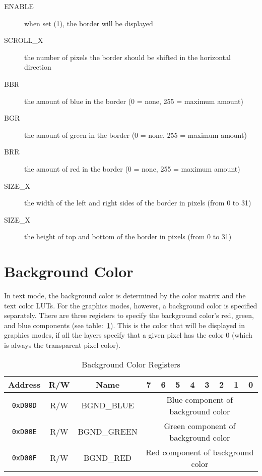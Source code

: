 \begin{description}
    \item[ENABLE] when set (1), the border will be displayed

    \item[SCROLL\_X] the number of pixels the border should be shifted in the horizontal direction

    \item[BBR] the amount of blue in the border (0 = none, 255 = maximum amount)

    \item[BGR] the amount of green in the border (0 = none, 255 = maximum amount)

    \item[BRR] the amount of red in the border (0 = none, 255 = maximum amount)

    \item[SIZE\_X] the width of the left and right sides of the border in pixels (from 0 to 31)

    \item[SIZE\_X] the height of top and bottom of the border in pixels (from 0 to 31)
\end{description}

\section{Background Color}

In text mode, the background color is determined by the color matrix and the text color LUTs. For the graphics modes, however, a background color is specified separately. There are three registers to specify the background color's red, green, and blue components (see table:~\ref{tab:back_reg}). This is the color that will be displayed in graphics modes, if all the layers specify that a given pixel has the color 0 (which is always the transparent pixel color).

\begin{table}[h]
    \begin{center}
        \begin{tabular}{|c|c|c|c|c|c|c|c|c|c|c|} \hline
            Address & R/W & Name & 7 & 6 & 5 & 4 & 3 & 2 & 1 & 0 \\\hline\hline
            \verb+0xD00D+ & R/W & BGND\_BLUE & \multicolumn{8}{|c|}{Blue component of background color} \\ \hline
            \verb+0xD00E+ & R/W & BGND\_GREEN & \multicolumn{8}{|c|}{Green component of background color} \\ \hline
            \verb+0xD00F+ & R/W & BGND\_RED & \multicolumn{8}{|c|}{Red component of background color} \\ \hline
        \end{tabular}
    \end{center}
    \caption{Background Color Registers}
    \label{tab:back_reg}
\end{table}

